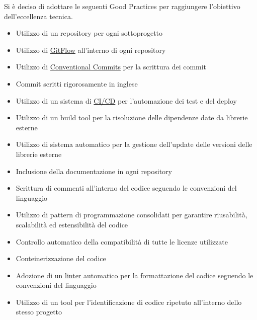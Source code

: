 \documentclass{article}
\begin{document}
Si è deciso di adottare le seguenti Good Practices per raggiungere l'obiettivo dell'eccellenza tecnica.

\begin{itemize}
  \item Utilizzo di un repository per ogni sottoprogetto
  \item Utilizzo di \href{https://www.atlassian.com/it/git/tutorials/comparing-workflows/gitflow-workflow}{GitFlow} all'interno di ogni repository
  \item Utilizzo di \href{https://www.conventionalcommits.org/en/v1.0.0/}{Conventional Commits} per la scrittura dei commit
  \item Commit scritti rigorosamente in inglese
  \item Utilizzo di un sistema di \href{https://en.wikipedia.org/wiki/CI/CD}{CI/CD} per l'automazione dei test e del deploy
  \item Utilizzo di un build tool per la risoluzione delle dipendenze date da librerie esterne
  \item Utilizzo di sistema automatico per la gestione dell'update delle versioni delle librerie esterne
  \item Inclusione della documentazione in ogni repository
  \item Scrittura di commenti all'interno del codice seguendo le convenzioni del linguaggio
  \item Utilizzo di pattern di programmazione consolidati per garantire riusabilità, scalabilità ed estensibilità del codice
  \item Controllo automatico della compatibilità di tutte le licenze utilizzate
  \item Conteinerizzazione del codice
  \item Adozione di un \href{https://en.wikipedia.org/wiki/Lint_(software)}{linter} automatico per la formattazione del codice seguendo le convenzioni del linguaggio
  \item Utilizzo di un tool per l'identificazione di codice ripetuto all'interno dello stesso progetto
\end{itemize}
\end{document}
